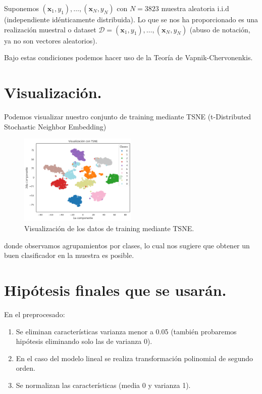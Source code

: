 \documentclass[11pt,a4paper]{article}
\theoremstyle{definition}
\begin{document}
	Suponemos $(\mathbf{x}_1,y_1),\ldots,(\mathbf{x}_N,y_N)$ con $N=3823$ muestra aleatoria i.i.d (independiente idénticamente distribuida). Lo que se nos ha proporcionado es una realización muestral o dataset $\mathcal{D}=(\mathbf{x}_1,y_1),\ldots,(\mathbf{x}_N,y_N)$ (abuso de notación, ya no son vectores aleatorios). 

	Bajo estas condiciones podemos hacer uso de la Teoría de  Vapnik-Chervonenkis.
	
	\section{Visualización.}
	Podemos visualizar nuestro conjunto de training mediante TSNE (t-Distributed Stochastic Neighbor Embedding)
	
	\begin{figure}[H]
	\centering
	\includegraphics[width=0.5\textwidth]{images/TSNE.png}
	\caption{Visualización de los datos de training mediante TSNE.}
	\end{figure}
	donde observamos agrupamientos por clases, lo cual nos sugiere que obtener un buen clasificador en la muestra es posible.

	
	\section{Hipótesis finales que se usarán.}
	En el preprocesado:
	\begin{enumerate}[label=(\arabic*)]
	\item Se eliminan características varianza menor a 0.05 (también probaremos hipótesis eliminando solo las de varianza 0).
	\item En el caso del modelo lineal se realiza transformación polinomial de segundo orden.
	\item Se normalizan las características (media 0 y varianza 1).
	\end{enumerate}
	
\end{document}
